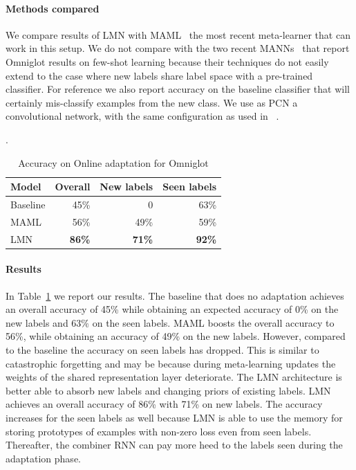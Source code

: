 \documentclass[letterpaper]{article} %
\begin{document}
\paragraph{Methods compared} We compare results of LMN with MAML~\cite{Finn2017ModelAgnosticMF} the most recent meta-learner that can work in this setup. We do not compare with the two recent MANNs~  that report Omniglot results on few-shot learning because their techniques do not easily extend to the case where new labels share label space with a pre-trained classifier. For reference we also report accuracy on the baseline classifier that will certainly mis-classify examples from the new class. We use as PCN a convolutional network, with the same configuration as used in ~.  

.  
\begin{table}[!htb]
      \centering
        \begin{tabular}{|l|r|r|r|} \hline
Model & Overall & New labels & Seen labels \\ \hline
Baseline & 45\% & 0 & 63\% \\
MAML & 56\% & 49\% & 59\%\\ 
LMN  & {\bf 86\%} & {\bf 71\%} & {\bf 92\%} \\  \hline 
\end{tabular}
 \caption{\label{tab-unk}Accuracy on Online adaptation for Omniglot}
\end{table}
\paragraph{Results} 
In Table~\ref{tab-unk} we report our results.  The baseline that does no adaptation achieves an overall accuracy of 45\% while obtaining an expected accuracy of 0\% on the new labels and $63\%$ on the seen labels.  MAML boosts the overall accuracy to 56\%, while obtaining an accuracy of 49\% on the new labels.  However, compared to the baseline the accuracy on seen labels has dropped. This is similar to catastrophic forgetting  and may be because during meta-learning updates the weights of the shared representation layer deteriorate.
The LMN architecture is better able to absorb new labels and changing priors of existing labels.  LMN achieves an overall accuracy of 86\% with 71\% on new labels. The accuracy increases for the seen labels as well because LMN is able to use the memory for storing prototypes of examples with non-zero loss even from seen labels. Thereafter, the combiner RNN can pay more heed to the labels seen during the adaptation phase.
    
\end{document}
